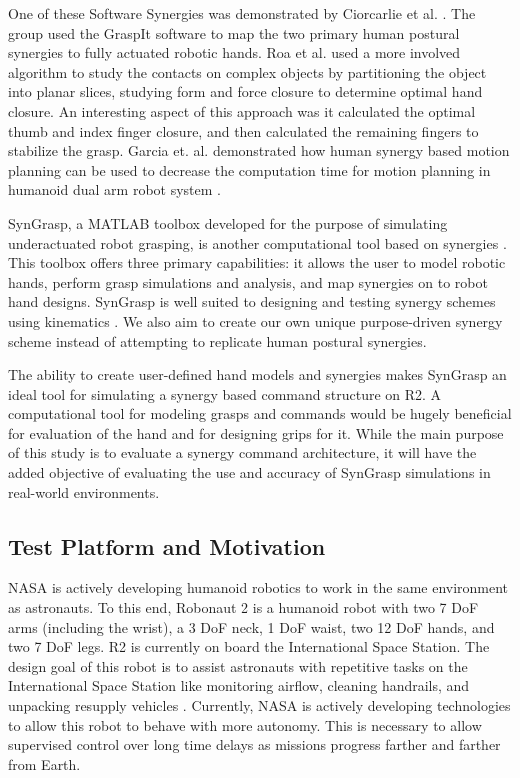 \documentclass[runningheads,a4paper]{llncs}
\begin{document}
 One of these Software Synergies was demonstrated by Ciorcarlie et al. \cite{ciocarlie_2007_dexterous}.  The group used the GraspIt software to map the two primary human postural synergies to fully actuated robotic hands.  Roa et al. \cite{power_grasp} used a more involved algorithm to study the contacts on complex objects by partitioning the object into planar slices, studying form and force closure  \cite{bicchi} to determine optimal hand closure. An interesting aspect of this approach was it calculated the optimal thumb and index finger closure, and then calculated the remaining fingers to stabilize the grasp.   Garcia et. al. demonstrated how human synergy based motion planning can be used to decrease the computation time for motion planning in humanoid dual arm robot system  \cite{garcia}.

SynGrasp, a MATLAB toolbox developed for the purpose of simulating underactuated robot grasping, is another computational tool based on synergies \cite{syngrasp}.  This toolbox offers three primary capabilities: it allows the user to model robotic hands, perform grasp simulations and analysis, and map synergies on to robot hand designs. SynGrasp is well suited to designing and testing  synergy schemes using kinematics \cite{salvietti_2016_map}.  We also aim to create our own unique purpose-driven synergy scheme instead of attempting to replicate human postural synergies.

The ability to create user-defined hand models and synergies makes SynGrasp an ideal tool for simulating a synergy based command structure on R2.  A computational tool for modeling grasps and commands would be hugely beneficial for evaluation of the hand and for designing grips for it. %
While the main purpose of this study is to evaluate a synergy command architecture, it will have the added objective of evaluating the use and accuracy of SynGrasp simulations in real-world environments.

\subsection{Test Platform and Motivation}

NASA is actively developing humanoid robotics to work in the same environment as astronauts. To this end, Robonaut 2 is a humanoid robot with two 7 DoF arms (including the wrist), a 3 DoF neck, 1 DoF waist, two 12 DoF hands, and two 7 DoF legs. R2 is currently on board the International Space Station. The design goal of this robot is to assist astronauts with repetitive tasks on the International Space Station like monitoring airflow, cleaning handrails, and unpacking resupply vehicles \cite{r2_diftler}. Currently, NASA is actively developing technologies to allow this robot to behave with more autonomy. This is necessary to allow supervised control over long time delays as missions progress farther and farther from Earth. 
\end{document}
